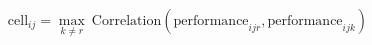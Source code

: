 \documentclass{article}
\begin{document}
 
\[
\mbox{cell}_{ij} = \max_{k\ne r} \ \mbox{Correlation}(\mbox{performance}_{ijr}, \mbox{performance}_{ijk})  
\]
 \newpage 
\end{document}
